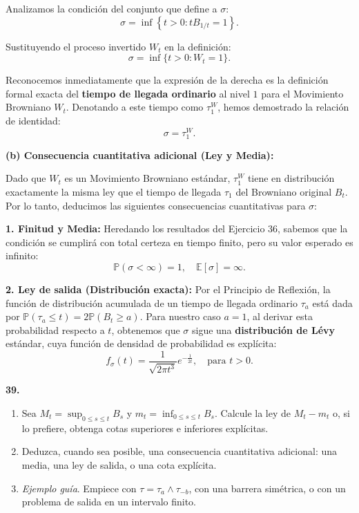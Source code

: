 \documentclass[11pt, letterpaper]{article}
\begin{document}
\begin{solucion}
    Analizamos la condición del conjunto que define a $\sigma$:
    \[ \sigma = \inf\left\{t > 0 : t B_{1/t} = 1\right\}. \]

    Sustituyendo el proceso invertido $W_t$ en la definición:
    \[ \sigma = \inf\{t > 0 : W_t = 1\}. \]

    Reconocemos inmediatamente que la expresión de la derecha es la definición formal exacta del \textbf{tiempo de llegada ordinario} al nivel $1$ para el Movimiento Browniano $W_t$.
    Denotando a este tiempo como $\tau_1^W$, hemos demostrado la relación de identidad:
    \[ \sigma = \tau_1^W. \]

    \textbf{(b) Consecuencia cuantitativa adicional (Ley y Media):}

    Dado que $W_t$ es un Movimiento Browniano estándar, $\tau_1^W$ tiene en distribución exactamente la misma ley que el tiempo de llegada $\tau_1$ del Browniano original $B_t$.
    Por lo tanto, deducimos las siguientes consecuencias cuantitativas para $\sigma$:

    \textbf{1. Finitud y Media:}
    Heredando los resultados del Ejercicio 36, sabemos que la condición se cumplirá con total certeza en tiempo finito, pero su valor esperado es infinito:
    \[ \mathbb{P}(\sigma < \infty) = 1, \quad \mathbb{E}[\sigma] = \infty. \]

    \textbf{2. Ley de salida (Distribución exacta):}
    Por el Principio de Reflexión, la función de distribución acumulada de un tiempo de llegada ordinario $\tau_a$ está dada por $\mathbb{P}(\tau_a \le t) = 2\mathbb{P}(B_t \ge a)$.
    Para nuestro caso $a=1$, al derivar esta probabilidad respecto a $t$, obtenemos que $\sigma$ sigue una \textbf{distribución de Lévy} estándar, cuya función de densidad de probabilidad es explícita:
    \[ f_\sigma(t) = \frac{1}{\sqrt{2\pi t^3}} e^{-\frac{1}{2t}}, \quad \text{para } t > 0. \]
\end{solucion}

\newpage

\begin{ejercicio}
    \textbf{39.} 
    \begin{enumerate}
        \item Sea $M_t = \sup_{0 \le s \le t} B_s$ y $m_t = \inf_{0 \le s \le t} B_s$. Calcule la ley de $M_t - m_t$ o, si lo prefiere, obtenga cotas superiores e inferiores explícitas.
        \item Deduzca, cuando sea posible, una consecuencia cuantitativa adicional: una media, una ley de salida, o una cota explícita.
        \item \textit{Ejemplo guía}. Empiece con $\tau = \tau_a \wedge \tau_{-b}$, con una barrera simétrica, o con un problema de salida en un intervalo finito.
    \end{enumerate}
\end{ejercicio}
\end{document}
